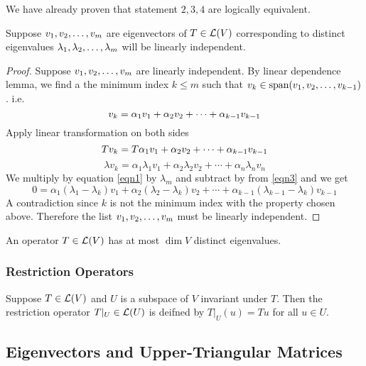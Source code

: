 We have already proven that statement $2,3,4$ are logically equivalent. 
\begin{theorem}
    Suppose ${v}_1,{v}_2, \ldots, {v}_{m}$ are eigenvectors of $T \in \mathcal L(V)$ corresponding to distinct eigenvalues ${\lambda}_1,{\lambda}_2, \ldots, {\lambda}_{m}$ will be linearly independent.
\end{theorem}
\begin{proof}
Suppose ${v}_1,{v}_2, \ldots, {v}_{m}$ are linearly independent. By linear dependence lemma, we find a the minimum index $k \leq m$ such that $v_k \in \text{span} ({v}_1,{v}_2, \ldots, {v}_{k-1})$. i.e.
\begin{equation} \label{eqn1}
     v_k = {\alpha}_1{v}_1 + {\alpha}_2{v}_2 + \cdots + {\alpha}_{k-1}{v}_{k-1} 
\end{equation}
Apply linear transformation on both sides 
\begin{equation} \label{eqn2}
    Tv_k = T{\alpha}_1{v}_1 + {\alpha}_2{v}_2 + \cdots + {\alpha}_{k-1}{v}_{k-1} 
\end{equation}
\begin{equation} \label{eqn3}
    \lambda v_k = \alpha_1 \lambda_1 v_1 + \alpha_2 \lambda_2 v_2 + \cdots + \alpha_n \lambda_n v_n 
\end{equation} 
We multiply by equation \ref{eqn1} by $\lambda_m$ and subtract by from \ref{eqn3} and we get \[ 0 = \alpha_1 (\lambda_1 - \lambda_k)v_1 + \alpha_2(\lambda_2 - \lambda_k)v_2 + \cdots + \alpha_{k-1} (\lambda_{k-1} - \lambda_k)v_{k-1}\]
A contradiction since $k$ is not the minimum index with the property chosen above. Therefore the list ${v}_1,{v}_2, \ldots, {v}_{m}$ must be linearly independent.
\end{proof}
\begin{corollary}
An operator $T \in \mathcal L(V)$ has at most $\boxed{\dim V}$ distinct eigenvalues.
\end{corollary}
\subsubsection{Restriction Operators}
\begin{definition}
    Suppose $T \in \mathcal L(V)$ and $U$ is a subspace of $V$ invariant under $T$. Then the restriction operator $T|_U \in \mathcal L(U)$ is deifned by $T|_U(u) = Tu$ for all $u \in U$.
\end{definition}
\subsection{Eigenvectors and Upper-Triangular
Matrices}

